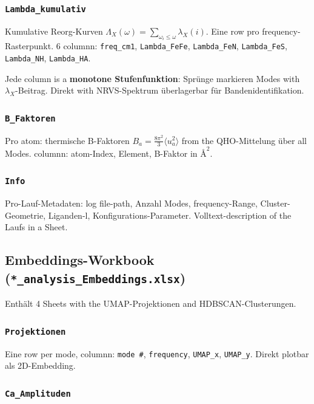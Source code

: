 \documentclass[11pt,a4paper,twoside]{article}
\providecommand{\angstrom}{\text{\AA}}    %
\theoremstyle{remark}
\begin{document}
\subsubsection*{\texttt{Lambda\_kumulativ}}

Kumulative Reorg-Kurven $\Lambda_X(\omega) = \sum_{\omega_i \leq \omega}
\lambda_X(i)$. Eine row pro frequency-Rasterpunkt. 6 columnn:
\texttt{freq\_cm1}, \texttt{Lambda\_FeFe}, \texttt{Lambda\_FeN},
\texttt{Lambda\_FeS}, \texttt{Lambda\_NH}, \texttt{Lambda\_HA}.

Jede column is a \textbf{monotone Stufenfunktion}: Spr\"unge
markieren Modes with $\lambda_X$-Beitrag. Direkt with NRVS-Spektrum
\"uberlagerbar f\"ur Bandenidentifikation.

\subsubsection*{\texttt{B\_Faktoren}}

Pro atom: thermische B-Faktoren $B_a = \frac{8\pi^2}{3} \langle u_a^2
\rangle$ from the QHO-Mittelung \"uber all Modes. columnn: atom-Index,
Element, B-Faktor in $\angstrom^2$.

\subsubsection*{\texttt{Info}}

Pro-Lauf-Metadaten: log file-path, Anzahl Modes, frequency-Range,
Cluster-Geometrie, Liganden-l, Konfigurations-Parameter.
Volltext-description of the Laufs in a Sheet.

\subsection{Embeddings-Workbook
            (\texttt{*\_analysis\_Embeddings.xlsx})}
\label{app:wb-embeddings}

Enth\"alt 4 Sheets with the UMAP-Projektionen and HDBSCAN-Clusterungen.

\subsubsection*{\texttt{Projektionen}}

Eine row per mode, columnn: \texttt{mode \#}, \texttt{frequency},
\texttt{UMAP\_x}, \texttt{UMAP\_y}. Direkt plotbar als 2D-Embedding.

\subsubsection*{\texttt{Ca\_Amplituden}}
\end{document}
